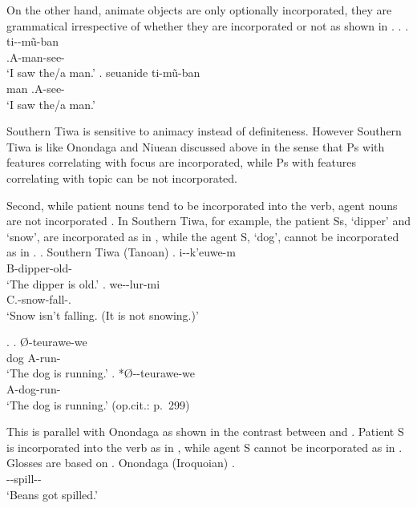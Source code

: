 On the other hand,
animate objects are only optionally incorporated,
they are grammatical irrespective of whether they are incorporated or not
as shown in \Next[a-b].
%
\ex.
 \ag. ti--m\~{u}-ban \\
      .{\sc A}-man-see- \\
      `I saw the/a man.'
 \bg. seuanide ti-m\~{u}-ban \\
      man .{\sc A}-see- \\
      `I saw the/a man.'
      \hfill{\cite[294-295]{allenetal84}}

Southern Tiwa is sensitive to animacy instead of definiteness.
However Southern Tiwa is like Onondaga and Niuean discussed above
in the sense that
Ps with features correlating with focus are incorporated,
while Ps with features correlating with topic can be not incorporated.


Second,
while patient nouns tend to be incorporated into the verb,
agent nouns are not incorporated \cite{mithun84,baker88}.
In Southern Tiwa, for example,
the patient Ss, `dipper' and `snow', are incorporated as in \Next,
while the agent S, `dog', cannot be incorporated as in \NNext.
\ex. Southern Tiwa (Tanoan)
 \ag. {i--k'euwe-m} \\
	{\sc B}-{dipper}-old- \\
	`The dipper is old.'
 \bg. {we--lur-mi} \\
	{\sc C}.-{snow}-fall-. \\
	`Snow isn't falling. (It is not snowing.)' \hfill{\cite[300]{allenetal84}}
	
\ex.
 \ag. {} {{\O}-teurawe-we} \\
	{dog} {\sc A}-run- \\
	`The dog is running.'
 \bg. *{{\O}--teurawe-we} \\
	{\sc A}-{dog}-run- \\
	`The dog is running.' \hfill{(op.cit.: p.~299)}

This is parallel with Onondaga as shown in the contrast between \Next and \NNext.
Patient S is incorporated into the verb as in \Next,
while agent S cannot be incorporated as in \Next[b].
Glosses are based on 
%
\ex. Onondaga (Iroquoian)
 \ag.  \\
	--spill-- \\
	`Beans got spilled.'
	\hfill{\cite[15]{woodbury75}}

